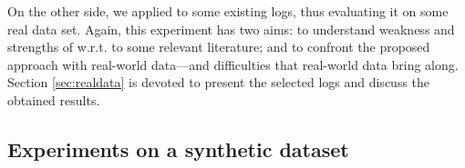 On the other side, we applied \nd to some existing logs, thus evaluating it on some real data set. Again, this experiment has two aims: to understand weakness and strengths of \nd w.r.t. to some relevant literature; and to confront the proposed approach with real-world data---and difficulties that real-world data bring along. Section \ref{sec:realdata} is devoted to present the selected logs and discuss the obtained results.




\subsection{Experiments on a synthetic dataset}
\label{sec:syntheticlog}

%


